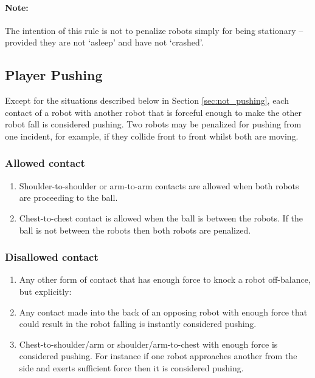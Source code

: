 \documentclass[12pt]{article}
\begin{document}
\paragraph{Note:} The intention of this rule is not to penalize robots simply for being stationary -- provided they are not `asleep' and have not `crashed'.

\subsection{Player Pushing}
\label{sec:player_pushing}

Except for the situations described below in Section \ref{sec:not_pushing}, each contact of a robot with another robot that is forceful enough to make the other robot fall is considered pushing. Two robots may be penalized for pushing from one incident, for example, if they collide front to front whilst both are moving.

\subsubsection{Allowed contact}

\begin{enumerate}

\item Shoulder-to-shoulder or arm-to-arm contacts are allowed when both robots are proceeding to the ball.

\item Chest-to-chest contact is allowed when the ball is between the robots. If the ball is not between the robots then both robots are penalized.

\end{enumerate}

\subsubsection{Disallowed contact}

\begin{enumerate}

\item Any other form of contact that has enough force to knock a robot off-balance, but explicitly:

\item Any contact made into the back of an opposing robot with enough force that could result in the robot falling is instantly considered pushing.

\item Chest-to-shoulder/arm or shoulder/arm-to-chest with enough force is considered pushing. For instance if one robot approaches another from the side and exerts sufficient force then it is considered pushing.

\end{enumerate}
\end{document}
